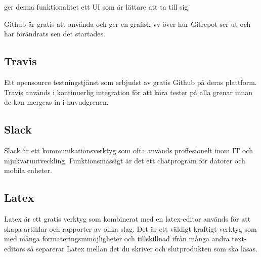 ger denna funktionalitet ett UI som är lättare att ta till sig. 

Github är gratis att använda och ger en grafisk vy över hur Gitrepot ser ut och har förändrats sen det startades. 

\subsection*{Travis}
Ett opensource testningstjänst som erbjudst av gratis Github på deras plattform. Travis används i kontinuerlig integration för att köra tester på alla grenar innan de kan mergeas in i huvudgrenen.

\subsection*{Slack}
Slack är ett kommunikationsverktyg som ofta används proffesionelt inom IT och mjukvaruutveckling. Funktionsmässigt är det ett chatprogram för datorer och mobila enheter.

\subsection*{Latex}
Latex är ett gratis verktyg som kombinerat med en latex-editor används för att skapa artiklar och rapporter av olika slag. Det är ett väldigt kraftigt verktyg som med många formateringsmmöjligheter och tillskillnad ifrån många andra text-editors så separerar Latex mellan det du skriver och slutprodukten som ska läsas.
